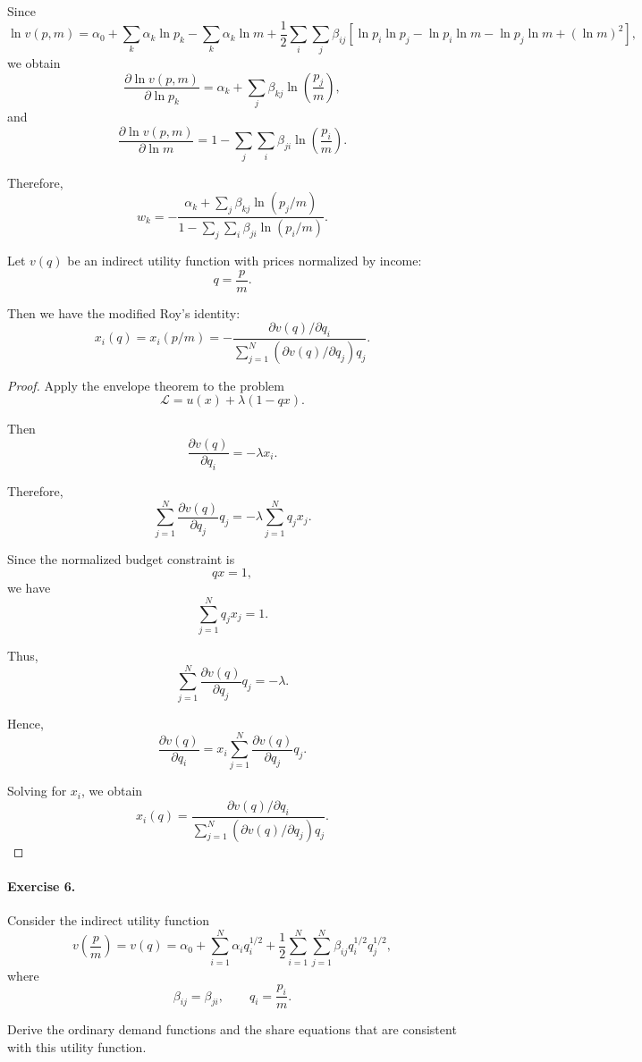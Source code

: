 Since
\[
\ln v(p,m)
=
\alpha_0
+
\sum_k \alpha_k\ln p_k
-
\sum_k \alpha_k\ln m
+
\frac{1}{2}
\sum_i\sum_j
\beta_{ij}
\left[
\ln p_i\ln p_j
-
\ln p_i\ln m
-
\ln p_j\ln m
+
(\ln m)^2
\right],
\]
we obtain
\[
\frac{\partial \ln v(p,m)}{\partial \ln p_k}
=
\alpha_k
+
\sum_j
\beta_{kj}
\ln\left(\frac{p_j}{m}\right),
\]
and
\[
\frac{\partial \ln v(p,m)}{\partial \ln m}
=
1
-
\sum_j\sum_i
\beta_{ji}
\ln\left(\frac{p_i}{m}\right).
\]

Therefore,
\[
w_k
=
-
\frac{
\alpha_k
+
\sum_j
\beta_{kj}
\ln(p_j/m)
}{
1
-
\sum_j\sum_i
\beta_{ji}
\ln(p_i/m)
}.
\]

\begin{theorem}
Let \(v(q)\) be an indirect utility function with prices normalized by income:
\[
q=\frac{p}{m}.
\]

Then we have the modified Roy's identity:
\[
x_i(q)
=
x_i(p/m)
=
-
\frac{
\partial v(q)/\partial q_i
}{
\sum_{j=1}^N
(\partial v(q)/\partial q_j)q_j
}.
\]
\end{theorem}

\begin{proof}
Apply the envelope theorem to the problem
\[
\mathcal{L}
=
u(x)+\lambda(1-qx).
\]

Then
\[
\frac{\partial v(q)}{\partial q_i}
=
-\lambda x_i.
\]

Therefore,
\[
\sum_{j=1}^N
\frac{\partial v(q)}{\partial q_j}q_j
=
-\lambda \sum_{j=1}^N q_jx_j.
\]

Since the normalized budget constraint is
\[
qx=1,
\]
we have
\[
\sum_{j=1}^N q_jx_j=1.
\]

Thus,
\[
\sum_{j=1}^N
\frac{\partial v(q)}{\partial q_j}q_j
=
-\lambda.
\]

Hence,
\[
\frac{\partial v(q)}{\partial q_i}
=
x_i
\sum_{j=1}^N
\frac{\partial v(q)}{\partial q_j}q_j.
\]

Solving for \(x_i\), we obtain
\[
x_i(q)
=
\frac{
\partial v(q)/\partial q_i
}{
\sum_{j=1}^N
(\partial v(q)/\partial q_j)q_j
}.
\]
\end{proof}

\paragraph{Exercise 6.}
Consider the indirect utility function
\[
v\left(\frac{p}{m}\right)
=
v(q)
=
\alpha_0
+
\sum_{i=1}^N
\alpha_i q_i^{1/2}
+
\frac{1}{2}
\sum_{i=1}^N
\sum_{j=1}^N
\beta_{ij}q_i^{1/2}q_j^{1/2},
\]
where
\[
\beta_{ij}=\beta_{ji},
\qquad
q_i=\frac{p_i}{m}.
\]

Derive the ordinary demand functions and the share equations that are consistent with this utility function.

